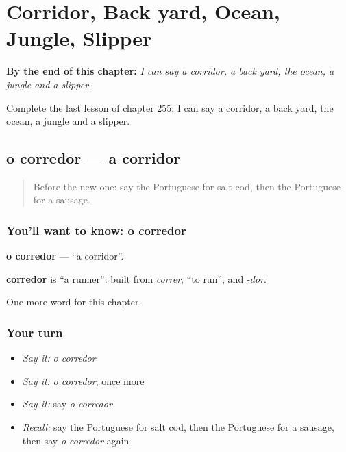 
\chapter{Corridor, Back yard, Ocean, Jungle, Slipper}
\label{ch:pt-corridor-back-yard-ocean-jungle-slipper}

\begin{chapteropening}
\textbf{By the end of this chapter:} \emph{I can say a corridor, a back yard, the ocean, a jungle and a slipper.}

Complete the last lesson of chapter 255: I can say a corridor, a back yard, the ocean, a jungle and a slipper.
\end{chapteropening}

\section[o corredor]{o corredor — a corridor}

\label{lesson:PT-C255-corredor}



\begin{quote}
Before the new one: say the Portuguese for salt cod, then the Portuguese for a sausage.
\end{quote}

\subsection*{You'll want to know: o corredor}
\textbf{o corredor} — \textquotedblleft{}a corridor\textquotedblright{}.

\begin{cousinweb}
\textbf{corredor} is \textquotedblleft{}a runner\textquotedblright{}: built from \emph{correr}, \textquotedblleft{}to run\textquotedblright{}, and \emph{-dor}.
\end{cousinweb}

\begin{grammarlens}[title={What you've built}]
One more word for this chapter.
\end{grammarlens}

\subsection*{Your turn}
\begin{itemize}
\raggedright
  \item \emph{Say it:} \emph{o corredor}
  \item \emph{Say it:} \emph{o corredor}, once more
  \item \emph{Say it:} say \emph{o corredor}
  \item \emph{Recall:} say the Portuguese for salt cod, then the Portuguese for a sausage, then say \emph{o corredor} again
\end{itemize}

